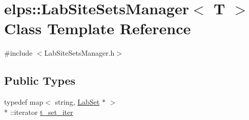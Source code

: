 \hypertarget{classelps_1_1_lab_site_sets_manager}{\section{elps\+:\+:Lab\+Site\+Sets\+Manager$<$ T $>$ Class Template Reference}
\label{classelps_1_1_lab_site_sets_manager}
}


{\ttfamily \#include $<$Lab\+Site\+Sets\+Manager.\+h$>$}

\subsection*{Public Types}
\begin{DoxyCompactItemize}
\item 
typedef map$<$ string, \hyperlink{classelps_1_1_lab_set}{Lab\+Set} $\ast$ $>$\\*
\+::iterator \hyperlink{classelps_1_1_lab_site_sets_manager_aaff30965d876fdb4744cb5eb4436c4f7}{t\+\_\+set\+\_\+iter}
\end{DoxyCompactItemize}
